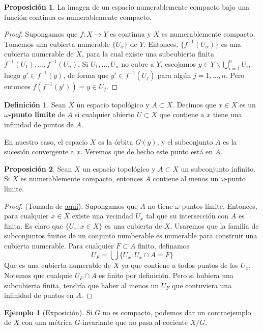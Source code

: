 \documentclass[spanish]{article}
\theoremstyle{definition}
\newtheorem*{defn}{Definición}
\newtheorem*{prop}{Proposición}
\newtheorem*{ejem}{Ejemplo}
\begin{document}
	\begin{prop}
		La imagen de un espacio numerablemente compacto bajo una función continua es numerablemente compacto.
	\end{prop}
	\begin{proof}
		Supongamos que $f:X\to Y$ es continua y $X$ es numerablemente compacto. Tomemos una cubierta numerable $\{U_\alpha\}$ de $Y$. Entonces, $\{f^{-1}(U_\alpha)\}$ es una cubierta numerable de $X$, para la cual existe una subcubierta finita $f^{-1}(U_1),\ldots,f^{-1}(U_n)$. Si $U_1,\ldots,U_n$ no cubre a $Y$, escojamos $y\in Y\backslash\bigcup_{i=1}^nU_i$, luego $y'\in f^{-1}(y)$, de forma que $y'\in f^{-1}(U_j)$ para algún $j=1,\ldots,n$. Pero entonces $f(f^{-1}(y'))=y\in U_j$.
	\end{proof}
	\begin{defn}
		Sean $X$ un espacio topológico y $A\subset X$. Decimos que $x\in X$ es un \textbf{$\omega$-punto límite} de $A$ si cualquier abierto $U\subset X$ que contiene a $x$ tiene una infinidad de puntos de $A$.
	\end{defn}
	En nuestro caso, el espacio $X$ es la órbita $G(y)$, y el subconjunto $A$ es la sucesión convergente a $x$. Veremos que de hecho este punto está en $A$.
	\begin{prop}\label{prop:num-comp}
		Sean $X$ un espacio topológico y $A\subset X$ un subconjunto infinito. Si $X$ es numerablemente compacto, entonces $A$ contiene al menos un $\omega$-punto límite.
	\end{prop}
	\begin{proof}
		(Tomada de \href{https://math.stackexchange.com/questions/1817245/a-topological-space-is-countably-compact-iff-every-countably-infinite-subset-has}{aquí}).
		Supongamos que $A$ no tiene $\omega$-puntos límite. Entonces, para cualquier $x\in X$ existe una vecindad $U_x$ tal que su intersección con $A$ es finita. Es claro que $\{U_x:x\in X\}$ es una cubierta de $X$. Usaremos que la familia de subconjuntos finitos de un conjunto numberable es numerable para construir una cubierta numerable. Para cualquier $F\subset A$ finito, definamos \[U_F=\bigcup\{U_x:U_x\cap A=F\}\]
		Que es una cubierta numerable de $X$ ya que contiene a todos puntos de los $U_x$. Notemos que cualquie $U_F\cap A$ es finito por definición. Pero si hubiera una subcubierta finita, tendría que haber al menos un $U_F$ que contuviera una infinidad de puntos en $A$.
	\end{proof}
	\begin{ejem}[Exposición]
		Si $G$ no es compacto, podemos dar un contraejemplo de $X$ con una métrica $G$-invariante que no pasa al cociente $X/G$.
	\end{ejem}
\end{document}
